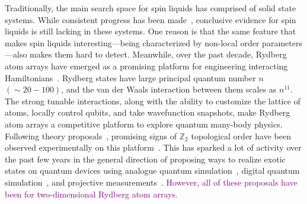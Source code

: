 \documentclass[twocolumn,superscriptaddress,amsmath,amssymb,aps,prx,nofootinbib]{revtex4-2}
\newcommand{\newtext}[1]{\textcolor{purple}{#1}}
\begin{document}
Traditionally, the main search space for spin liquids has comprised of solid state systems. While consistent progress has been made~\cite{savary2017,knolle2019field}, conclusive evidence for spin liquids is still lacking in these systems. One reason is that the same feature that makes spin liquids interesting---being characterized by non-local order parameters---also makes them hard to detect. Meanwhile, over the past decade, Rydberg atom arrays have emerged as a promising platform for engineering interacting Hamiltonians~\cite{weimer2010rydberg,ebadi2021quantum,wu2021concise,saffman2010,lukin2001,labuhn2016,jaksch2000,browaeys2016,barredo2016anatom,beguin2013,barredo2018,semeghini2021, bernien2017probing,bluvstein2022quantum,guardado-sanchez2018probing,keesling2019quantum,levine2019parallel,lienhard2018observing,madjarov2020highfidelity,omran2019generation,schauss2015crystallization,song2021quantum}. Rydberg states have large principal quantum number $n$ $(\sim 20-100)$, and the van der Waals interaction between them scales as $n^{11}$. The strong tunable interactions, along with the ability to customize the lattice of atoms, locally control qubits, and take wavefunction snapshots, make Rydberg atom arrays a competitive platform to explore quantum many-body physics. Following theory proposals~\cite{verresen2021,samajdar2021}, promising signs of $\mathbb{Z}_2$ topological order have been observed experimentally on this platform~\cite{semeghini2021}. This has sparked a lot of activity over the past few years in the general direction of proposing ways to realize exotic states on quantum devices using analogue quantum simulation~\cite{myerson2022construction,slagle2022quantum, giudice2022trimer,zhou2022quantum, tarabunga2023classification, kornjaca2023trimer,ohler2023quantum}, digital quantum simulation~\cite{liu2021methods}, and projective measurements~\cite{tantivasadakarn2022shortest,verresen2021efficiently}. \newtext{However, all of these proposals have been for two-dimensional Rydberg atom arrays.} 
\end{document}
